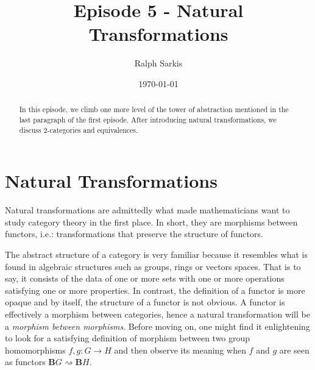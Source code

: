 \documentclass{article}
\title{Episode 5 - Natural Transformations\vspace{-10pt}}
\author{Ralph Sarkis}
\date{\vspace{-10pt}\today\vspace{-15pt}}  %
\theoremstyle{definition}
\theoremstyle{remark}
\begin{document}
\maketitle
\begin{abstract} In this episode, we climb one more level of the tower of abstraction mentioned in the last paragraph of the first episode. After introducing natural transformations, we discuss 2-categories and equivalences.
\end{abstract}
\section{Natural Transformations}
Natural transformations are admittedly what made mathematicians want to study category theory in the first place. In short, they are morphisms between functors, i.e.: transformations that preserve the structure of functors.

The abstract structure of a category is very familiar because it resembles what is found in algebraic structures such as groups, rings or vectors spaces. That is to say, it consists of the data of one or more sets with one or more operations satisfying one or more properties. In contrast, the definition of a functor is more opaque and by itself, the structure of a functor is not obvious. A functor is effectively a morphism between categories, hence a natural transformation will be a \textit{morphism between morphisms}. Before moving on, one might find it enlightening to look for a satisfying definition of morphism between two group homomorphisms $f,g: G \rightarrow H$ and then observe its meaning when $f$ and $g$ are seen as functors $\mathbf{B}G \rightsquigarrow \mathbf{B}H$.
\end{document}
